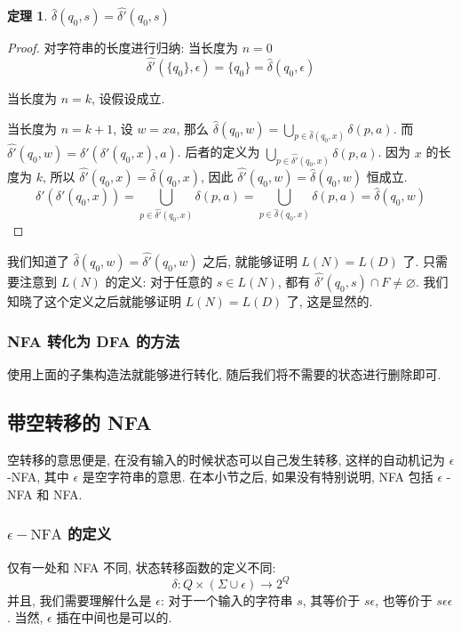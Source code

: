 \documentclass[12pt]{ctexart}
\theoremstyle{definition}
\theoremstyle{definition}
\newtheorem{thm}[definition]{定理}
\theoremstyle{plain}
\begin{document}
\begin{thm}
\( \hat{\delta}(q_{0},s) = \hat{\delta'}(q_{0}, s)\)
\end{thm}
\begin{proof}
对字符串的长度进行归纳:
当长度为 \(n=0\)
\begin{equation}
\hat{\delta'} (\{q_{0}\}, \epsilon ) = \{q_{0} \}  = \hat{\delta} (q_{0}, \epsilon) 
\end{equation}

当长度为 \(n = k\), 设假设成立.

当长度为 \(n  = k  + 1\), 设 \(w = x a \), 那么 \( \hat{\delta} (q_{0}, w ) = \bigcup_{p \in \hat{\delta} (q_{0}, x) } \delta (p, a)\). 
而 \( \hat{\delta'} (q_{0}, w) = \delta'  (\delta' (q_{0}, x), a)\). 后者的定义为 \(\bigcup_{p \in \hat{\delta'}(q_{0}, x)} \delta(p, a)\). 
因为 \(x\) 的长度为 \(k\), 所以 \( \hat{\delta' } (q_{0}, x) = \hat{\delta} (q_{0}, x)\), 因此 \( \hat{\delta ' } (q_{0}, w) = \hat{\delta} (q_{0}, w) \) 恒成立. 
\begin{equation}
\delta ' (\delta' (q_{0}, x)) = \bigcup_{p \in \hat{\delta'} (q_{0}, x )} 
\delta (p, a ) = \bigcup_{p \in \hat{\delta} (q _{0}, x) } \delta (p, a ) = \hat{\delta} (q_{0}, w) 
\end{equation}
\end{proof}
我们知道了 \( \hat{\delta} (q_{0}, w )  = \hat{\delta ' } (q_{0}, w )\) 之后, 就能够证明 \(L (N) = L(D)\) 了. 只需要注意到 \(L (N)\) 的定义: 对于任意的 \(s \in L (N)\), 都有 \( \hat{\delta' } (q_{0}, s) \cap F \ne \varnothing \). 我们知晓了这个定义之后就能够证明 \(L (N) = L (D)\) 了, 这是显然的. 

\subsubsection{NFA 转化为 DFA 的方法}
使用上面的子集构造法就能够进行转化, 随后我们将不需要的状态进行删除即可. 
\subsection{带空转移的 NFA}
空转移的意思便是, 在没有输入的时候状态可以自己发生转移, 这样的自动机记为 \(\epsilon\)-NFA, 其中 \(\epsilon\) 是空字符串的意思. 在本小节之后, 如果没有特别说明, NFA 包括 \(\epsilon\) - NFA 和 NFA. 
\subsubsection{\(\epsilon-\text{NFA}\) 的定义}
仅有一处和 NFA 不同, 状态转移函数的定义不同: 
\begin{equation}
\delta \colon Q \times (\Sigma \cup \epsilon ) \to 2 ^{Q}
\end{equation}
并且, 我们需要理解什么是 \(\epsilon\): 对于一个输入的字符串 \(s\), 其等价于 \(s\epsilon\), 也等价于 \(s\epsilon\epsilon\). 当然, \(\epsilon\) 插在中间也是可以的.
\end{document}
